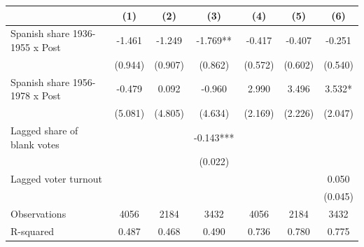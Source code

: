 \begin{table}
\centering
\begin{tabular}[t]{lcccccc}
\toprule
  & (1) & (2) & (3) & (4) & (5) & (6)\\
\midrule
Spanish share 1936-1955 x Post & -1.461 & -1.249 & -1.769** & -0.417 & -0.407 & -0.251\\
 & (0.944) & (0.907) & (0.862) & (0.572) & (0.602) & (0.540)\\
Spanish share 1956-1978 x Post & -0.479 & 0.092 & -0.960 & 2.990 & 3.496 & 3.532*\\
 & (5.081) & (4.805) & (4.634) & (2.169) & (2.226) & (2.047)\\
Lagged share of blank votes &  &  & -0.143*** &  &  & \\
 &  &  & (0.022) &  &  & \\
Lagged voter turnout &  &  &  &  &  & 0.050\\
 &  &  &  &  &  & (0.045)\\
\midrule
Observations & 4056 & 2184 & 3432 & 4056 & 2184 & 3432\\
R-squared & 0.487 & 0.468 & 0.490 & 0.736 & 0.780 & 0.775\\
\bottomrule
\end{tabular}
\end{table}
